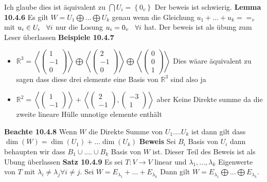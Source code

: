\documentclass{article}
\newcommand{\smspc}{\hspace{0.3cm}}
\begin{document}
\newline Ich glaube dies ist äquivalent zu $\bigcap U_i=\left\lbrace0_v\right\rbrace$ Der beweis ist schwierig.
\newline\textbf{Lemma 10.4.6} Es gilt $W=U_1\bigoplus...\bigoplus U_k$ genau wenn die Gleichung $u_1+...+u_k==_v$ mit $u_i\in U_i \smspc \forall i$ nur die Losung $u_i=0_v\smspc\forall i$ hat. Der beweis ist als übung zum Leser überlassen\newline
\textbf{Beispiele 10.4.7}\begin{itemize}
\item{$\mathbb{R}^3=\left<\begin{pmatrix}1\\-1\\0\end{pmatrix}\right>\bigoplus\left<\begin{pmatrix}2\\-1\\0\end{pmatrix}\right>\bigoplus\left<\begin{pmatrix}0\\0\\1\end{pmatrix}\right>$ Dies wäare äquivalent zu sagen dass diese drei elemente eine Basis von $\mathbb{R}^3$ sind also ja}
\item{$\mathbb{R}^2=\left<\begin{pmatrix}1\\-1\end{pmatrix}\right>+\left<\begin{pmatrix}2\\-1\end{pmatrix},\begin{pmatrix}-3\\1\end{pmatrix}\right>$ aber Keine Direkte summe da die zweite lineare Hülle unnotige elemente enthält}
  
\end{itemize}
\textbf{Beachte 10.4.8} Wenn $W$ die Direkte Summe von $U_1....U_k$ ist dann gilt dass $\dim(W)=\dim(U_1)+...\dim(U_k)$
\newline\textbf{Beweis} Sei $B_i$ Basis von $U_i$ dann behaupten wir dass $B_1\cup....\cup B_k$ Basis von $W$ ist. Dieser Teil des Beweis ist als Ubung überlassen \newline
\textbf{Satz 10.4.9} Es sei $T:V\rightarrow V$ linear und $\lambda_1,...,\lambda_k$ Eigenwerte von $T$ mit $\lambda_i\neq\lambda_j\forall i\neq j$. Sei $W =E_{\lambda_1}+...+E_{\lambda_k}$ Dann gilt $W=E_{\lambda_1}\bigoplus...\bigoplus E_{\lambda_k}$.
\end{document}
